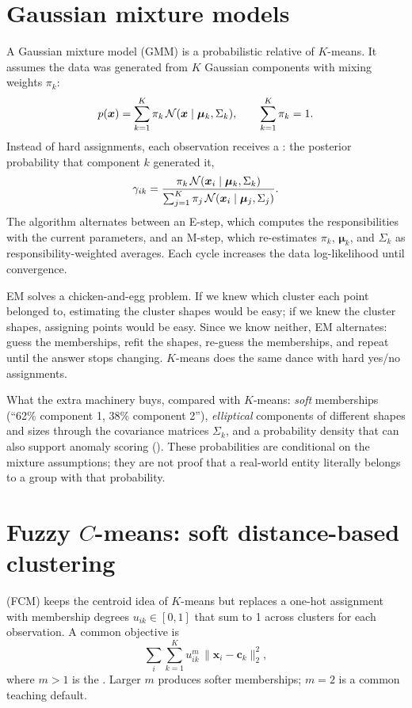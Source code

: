 \section{Gaussian mixture models}

A Gaussian mixture model (GMM) is a probabilistic relative of $K$-means. It assumes the data was generated from $K$ Gaussian components with mixing weights $\pi_k$:
\[
  p(\bm{x})
  =\sum_{k=1}^{K}
  \pi_k\,
  \mathcal{N}(\bm{x}\mathrel{|}\bm{\mu}_k,\Sigma_k),
  \qquad
  \sum_{k=1}^{K}\pi_k=1 .
\]
Instead of hard assignments, each observation receives a : the posterior probability that component $k$ generated it,
\[
  \gamma_{ik}
  =\frac{\pi_k\,\mathcal{N}(\bm{x}_i\mathrel{|}\bm{\mu}_k,\Sigma_k)}
        {\sum_{j=1}^{K}\pi_j\,\mathcal{N}(\bm{x}_i\mathrel{|}\bm{\mu}_j,\Sigma_j)} .
\]
The  algorithm alternates between an E-step, which computes the responsibilities with the current parameters, and an M-step, which re-estimates $\pi_k$, $\bm{\mu}_k$, and $\Sigma_k$ as responsibility-weighted averages. Each cycle increases the data log-likelihood until convergence.

\begin{intuition}
EM solves a chicken-and-egg problem. If we knew which cluster each point belonged to, estimating the cluster shapes would be easy; if we knew the cluster shapes, assigning points would be easy. Since we know neither, EM alternates: guess the memberships, refit the shapes, re-guess the memberships, and repeat until the answer stops changing. $K$-means does the same dance with hard yes/no assignments.
\end{intuition}

What the extra machinery buys, compared with $K$-means: \emph{soft} memberships (``62\% component 1, 38\% component 2''), \emph{elliptical} components of different shapes and sizes through the covariance matrices $\Sigma_k$, and a probability density that can also support anomaly scoring (). These probabilities are conditional on the mixture assumptions; they are not proof that a real-world entity literally belongs to a group with that probability.

\section{Fuzzy $C$-means: soft distance-based clustering}

 (FCM) keeps the centroid idea of $K$-means but replaces a one-hot assignment with membership degrees $u_{ik}\in[0,1]$ that sum to 1 across clusters for each observation. A common objective is
\[
  \sum_i\sum_{k=1}^{K} u_{ik}^{m}\,\|\bm{x}_i-\bm{c}_k\|_2^2,
\]
where $m>1$ is the . Larger $m$ produces softer memberships; $m=2$ is a common teaching default.

